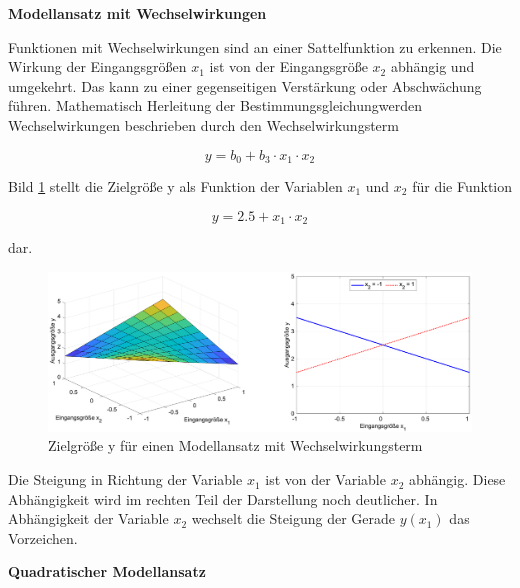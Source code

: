 \clearpage 

\selectfont
\noindent\textbf{Modellansatz mit Wechselwirkungen} \smallskip

\noindent Funktionen mit Wechselwirkungen sind an einer Sattelfunktion zu erkennen. Die Wirkung der Eingangsgr\"{o}{\ss}en $x_{1}$ ist von der Eingangsgr\"{o}{\ss}e $x_{2}$ abh\"{a}ngig und umgekehrt. Das kann zu einer gegenseitigen Verst\"{a}rkung oder Abschw\"{a}chung f\"{u}hren. Mathematisch Herleitung der Bestimmungsgleichungwerden Wechselwirkungen beschrieben durch den Wechselwirkungsterm

\begin{equation}\label{eq:thirteentwentytwo}
y=b_{0} +b_{3} \cdot x_{1} \cdot x_{2}
\end{equation}

\noindent Bild \ref{fig:Funktionsansatz2} stellt die Zielgr\"{o}{\ss}e y als Funktion der Variablen $x_{1}$ und $x_{2}$ f\"{u}r die Funktion

\begin{equation}\label{eq:thirteentwentythree}
y=2.5+x_{1} \cdot x_{2}
\end{equation}

\noindent dar. 

\noindent 
\begin{figure}[H]
  \centerline{\includegraphics[width=1\textwidth]{Kapitel13/Bilder/image3}}
  \caption{Zielgr\"{o}{\ss}e y f\"{u}r einen Modellansatz mit Wechselwirkungsterm}
  \label{fig:Funktionsansatz2}
\end{figure}

\noindent Die Steigung in Richtung der Variable $x_{1}$ ist von der Variable $x_{2}$ abh\"{a}ngig. Diese Abh\"{a}ngigkeit wird im rechten Teil der Darstellung noch deutlicher. In Abh\"{a}ngigkeit der Variable $x_{2}$ wechselt die Steigung der Gerade $y(x_{1})$ das Vorzeichen.\bigskip

\selectfont
\noindent\textbf{Quadratischer Modellansatz} \smallskip

